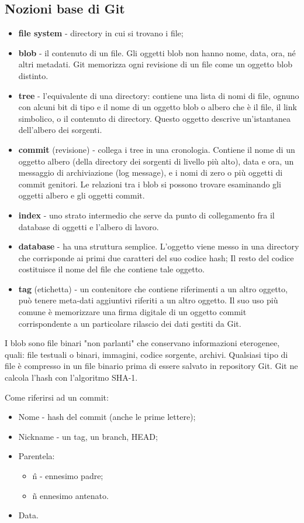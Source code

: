 \documentclass[a4paper,12pt,titlepage,oneside]{book}
\begin{document}
\subsection{Nozioni base di Git}
\begin{itemize}
    \item \textbf{file system} - directory in cui si trovano i file;
    \item \textbf{blob} - il contenuto di un file. Gli oggetti blob non hanno nome, data, ora, né altri metadati. 
        Git memorizza ogni revisione di un file come un oggetto blob distinto.
    \item \textbf{tree} - l'equivalente di una directory: contiene una lista di nomi di file, ognuno con alcuni bit di tipo e il nome di un oggetto blob o 
        albero che è il file, il link simbolico, o il contenuto di directory. Questo oggetto descrive un'istantanea dell'albero dei sorgenti.
    \item \textbf{commit} (revisione) - collega i tree in una cronologia. Contiene il nome di un oggetto albero (della directory dei sorgenti di livello più alto), 
        data e ora, un messaggio di archiviazione (log message), e i nomi di zero o più oggetti di commit genitori. Le relazioni tra i blob si possono trovare 
        esaminando gli oggetti albero e gli oggetti commit.
    \item \textbf{index} - uno strato intermedio che serve da punto di collegamento fra il database di oggetti e l'albero di lavoro.
    \item \textbf{database} - ha una struttura semplice. L'oggetto viene messo in una directory che corrisponde ai primi due caratteri del suo codice hash; 
        Il resto del codice costituisce il nome del file che contiene tale oggetto. 
    \item \textbf{tag} (etichetta) - un contenitore che contiene riferimenti a un altro oggetto, può tenere meta-dati aggiuntivi riferiti a un altro oggetto. 
        Il suo uso più comune è memorizzare una firma digitale di un oggetto commit corrispondente a un particolare rilascio dei dati gestiti da Git.
\end{itemize} 
I blob sono file binari "non parlanti" che conservano informazioni eterogenee, quali: file testuali o binari, immagini, codice sorgente, archivi. 
Qualsiasi tipo di file è compresso in un file binario prima di essere salvato in repository Git. Git ne calcola l'hash con l'algoritmo SHA-1.

Come riferirsi ad un commit:
\begin{itemize}
    \item Nome - hash del commit (anche le prime lettere);
    \item Nickname - un tag, un branch, HEAD;
    \item Parentela:
    \begin{itemize}
        \item \^n - ennesimo padre;
        \item \~n ennesimo antenato.
    \end{itemize} 
    \item Data.
\end{itemize} 
\end{document}
